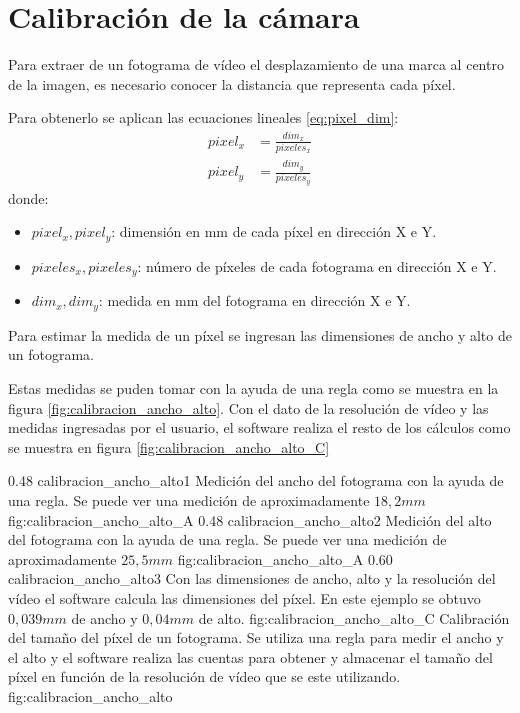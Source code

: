 \section{Calibración de la cámara} 
   Para extraer de un fotograma de vídeo el desplazamiento de una marca al centro de la imagen, es necesario conocer la distancia que representa cada píxel.\par
   Para obtenerlo se aplican las ecuaciones lineales \ref{eq:pixel_dim}:
   \begin{equation}
      \begin{aligned}
         pixel_x&=\frac{dim_x}{pixeles_x} \\
         pixel_y&=\frac{dim_y}{pixeles_y}
      \end{aligned}
      \label{eq:pixel_dim}
   \end{equation}
donde:
\begin{itemize}
   \item{$pixel_x,pixel_y$: dimensión en mm de cada píxel en dirección X e Y.}
   \item{$pixeles_x, pixeles_y$: número de píxeles de cada fotograma en dirección X e Y.}
   \item{$dim_x, dim_y$: medida en mm del fotograma en dirección X e Y.}
\end{itemize}

Para estimar la medida de un píxel se ingresan las dimensiones de ancho y alto de un fotograma. \par
Estas medidas se puden tomar con la ayuda de una regla como se muestra en la figura \ref{fig:calibracion_ancho_alto}.
Con el dato de la resolución de vídeo y las medidas ingresadas por el usuario, el software realiza el resto de los cálculos como se muestra en figura \ref{fig:calibracion_ancho_alto_C}

\subfigabc
   {0.48} {calibracion_ancho_alto1} {Medición del ancho del fotograma con la ayuda de una regla. Se puede ver una medición de aproximadamente $18,2 mm$} {fig:calibracion_ancho_alto_A}
   {0.48} {calibracion_ancho_alto2} {Medición del alto del fotograma con la ayuda de una regla. Se puede ver una medición de aproximadamente $25,5 mm$} {fig:calibracion_ancho_alto_A}
   {0.60} {calibracion_ancho_alto3} {Con las dimensiones de ancho, alto y la resolución del vídeo el software calcula las dimensiones del píxel. En este ejemplo se obtuvo $0,039 mm$ de ancho y $0,04 mm$ de alto.} {fig:calibracion_ancho_alto_C}
   {Calibración del tamaño del píxel de un fotograma. Se utiliza una regla para medir el ancho y el alto y el software realiza las cuentas para obtener y almacenar el tamaño del píxel en función de la resolución de vídeo que se este utilizando.}
   {fig:calibracion_ancho_alto}

